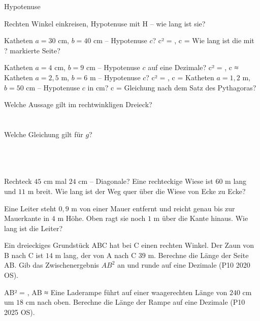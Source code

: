 \begin{aufgabe}{Hypotenuse}
\begin{teile}
\teil Rechten Winkel einkreisen, Hypotenuse mit H – wie lang ist sie?

\leerfeld[cm]
\teil Katheten $a = 30$ cm, $b = 40$ cm – Hypotenuse $c$? c² = \leerfeld , c = \leerfeld[cm]
\teil Wie lang ist die mit ? markierte Seite?

\leerfeld[cm]
\teil Katheten $a = 4$ cm, $b = 9$ cm – Hypotenuse $c$ auf eine Dezimale? c² = \leerfeld , c ≈ \leerfeld[cm]
\teil Katheten $a = 2{,}5$ m, $b = 6$ m – Hypotenuse $c$? c² = \leerfeld , c = \leerfeld[m]
\teil Katheten $a = 1{,}2$ m, $b = 50$ cm – Hypotenuse $c$ in cm? c = \leerfeld[cm]
\teil Gleichung nach dem Satz des Pythagoras?

\teil Welche Aussage gilt im rechtwinkligen Dreieck? \\  \\  \\ 
\teil Welche Gleichung gilt für $g$? \\  \\  \\  \\ 

\teil Rechteck $45$ cm mal $24$ cm – Diagonale? \leerfeld[cm]
\teil Eine rechteckige Wiese ist $60$ m lang und $11$ m breit. Wie lang ist der Weg quer über die Wiese von Ecke zu Ecke?

\leerfeld[m]
\teil Eine Leiter steht $0{,}9$ m von einer Mauer entfernt und reicht genau bis zur Mauerkante in $4$ m Höhe. Oben ragt sie noch $1$ m über die Kante hinaus. Wie lang ist die Leiter?

\leerfeld[m]
\teil Ein dreieckiges Grundstück ABC hat bei C einen rechten Winkel. Der Zaun von B nach C ist $14$ m lang, der von A nach C $39$ m. Berechne die Länge der Seite AB. Gib das Zwischenergebnis $AB^2$ an und runde auf eine Dezimale \hfill (P10 2020 OS).

AB² = \leerfeld , AB ≈ \leerfeld[m]
\teil Eine Laderampe führt auf einer waagerechten Länge von $240$ cm um $18$ cm nach oben. Berechne die Länge der Rampe auf eine Dezimale \hfill (P10 2025 OS).

\leerfeld[cm]
\end{teile}
\end{aufgabe}

